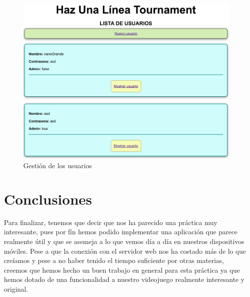 \documentclass{article}
\begin{document}
\begin{figure}[H]
  \includegraphics[width=\textwidth]{imagenes/adminUsers.png}
  \caption{Gestión de los usuarios} 
\end{figure}

\section{Conclusiones}
Para finalizar, tenemos que decir que nos ha parecido una práctica muy interesante, pues por fín hemos podido implementar una aplicación que parece
realmente útil y que se asemeja a lo que vemos día a día en nuestros dispositivos móviles. Pese a que la conexión con el servidor web nos ha costado más
de lo que creíamos y pese a no haber tenido el tiempo suficiente por otras materias, creemos que hemos hecho un buen trabajo en general para esta práctica ya que
hemos dotado de una funcionalidad a nuestro videojuego realmente interesante y original. 
\end{document}
